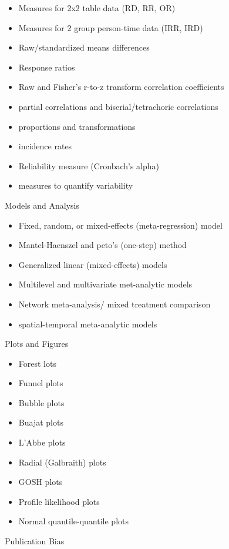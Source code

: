\documentclass[
]{book}
\begin{document}
\begin{itemize}
\item
  Measures for 2x2 table data (RD, RR, OR)
\item
  Measures for 2 group person-time data (IRR, IRD)
\item
  Raw/standardized means differences
\item
  Response ratios
\item
  Raw and Fisher's r-to-z transform correlation coefficients
\item
  partial correlations and biserial/tetrachoric correlations
\item
  proportions and transformations
\item
  incidence rates
\item
  Reliability measure (Cronbach's alpha)
\item
  measures to quantify variability
\end{itemize}

Models and Analysis

\begin{itemize}
\item
  Fixed, random, or mixed-effects (meta-regression) model
\item
  Mantel-Haenszel and peto's (one-step) method
\item
  Generalized linear (mixed-effects) models
\item
  Multilevel and multivariate met-analytic models
\item
  Network meta-analysis/ mixed treatment comparison
\item
  spatial-temporal meta-analytic models
\end{itemize}

Plots and Figures

\begin{itemize}
\item
  Forest lots
\item
  Funnel plots
\item
  Bubble plots
\item
  Buajat plots
\item
  L'Abbe plots
\item
  Radial (Galbraith) plots
\item
  GOSH plots
\item
  Profile likelihood plots
\item
  Normal quantile-quantile plots
\end{itemize}

Publication Bias
\end{document}
